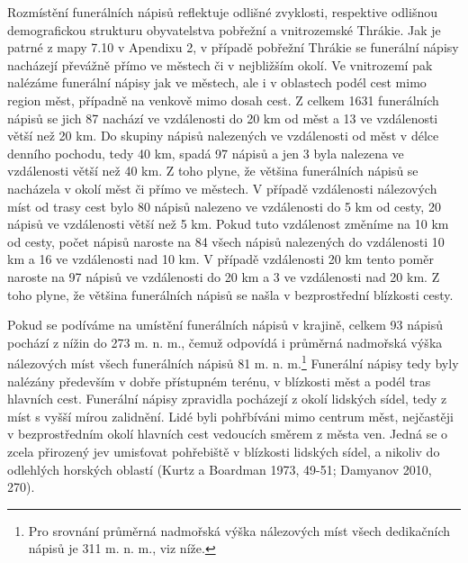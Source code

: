 Rozmístění funerálních nápisů reflektuje odlišné zvyklosti, respektive odlišnou demografickou strukturu obyvatelstva pobřežní a vnitrozemské Thrákie. Jak je patrné z mapy 7.10 v Apendixu 2, v případě pobřežní Thrákie se funerální nápisy nacházejí převážně přímo ve městech či v nejbližším okolí. Ve vnitrozemí pak nalézáme funerální nápisy jak ve městech, ale i v oblastech podél cest mimo region měst, případně na venkově mimo dosah cest. Z celkem 1631 funerálních nápisů se jich 87  nachází ve vzdálenosti do 20 km od měst a 13  ve vzdálenosti větší než 20 km. Do skupiny nápisů nalezených ve vzdálenosti od měst v délce denního pochodu, tedy 40 km, spadá 97  nápisů a jen 3  byla nalezena ve vzdálenosti větší než 40 km. Z toho plyne, že většina funerálních nápisů se nacházela v okolí měst či přímo ve městech. V případě vzdálenosti nálezových míst od trasy cest bylo 80  nápisů nalezeno ve vzdálenosti do 5 km od cesty, 20  nápisů ve vzdálenosti větší než 5 km. Pokud tuto vzdálenost změníme na 10 km od cesty, počet nápisů naroste na 84  všech nápisů nalezených do vzdálenosti 10 km a 16  ve vzdálenosti nad 10 km. V případě vzdálenosti 20 km tento poměr naroste na 97  nápisů ve vzdálenosti do 20 km a 3  ve vzdálenosti nad 20 km. Z toho plyne, že většina funerálních nápisů se našla v bezprostřední blízkosti cesty.

Pokud se podíváme na umístění funerálních nápisů v krajině, celkem 93  nápisů pochází z nížin do 273 m. n. m., čemuž odpovídá i průměrná nadmořská výška nálezových míst všech funerálních nápisů 81 m. n. m.\footnote{Pro srovnání průměrná nadmořská výška nálezových míst všech dedikačních nápisů je 311 m. n. m., viz níže.} Funerální nápisy tedy byly nalézány především v dobře přístupném terénu, v blízkosti měst a podél tras hlavních cest. Funerální nápisy zpravidla pocházejí z okolí lidských sídel, tedy z míst s vyšší mírou zalidnění. Lidé byli pohřbíváni mimo centrum měst, nejčastěji v bezprostředním okolí hlavních cest vedoucích směrem z města ven. Jedná se o zcela přirozený jev umisťovat pohřebiště v blízkosti lidských sídel, a nikoliv do odlehlých horských oblastí (Kurtz a Boardman 1973, 49-51; Damyanov 2010, 270).

